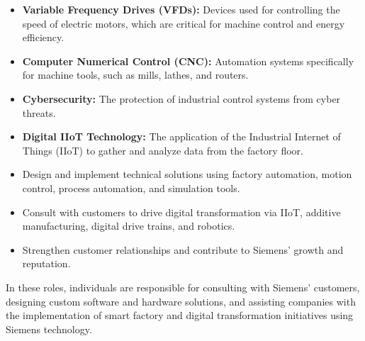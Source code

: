 \documentclass[11pt]{article}
\begin{document}
\begin{itemize}
  \item \textbf{Variable Frequency Drives (VFDs):} Devices used for controlling the speed of electric motors, which are critical for machine control and energy efficiency.
  \item \textbf{Computer Numerical Control (CNC):} Automation systems specifically for machine tools, such as mills, lathes, and routers.
  \item \textbf{Cybersecurity:} The protection of industrial control systems from cyber threats.
  \item \textbf{Digital IIoT Technology:} The application of the Industrial Internet of Things (IIoT) to gather and analyze data from the factory floor.
  \item Design and implement technical solutions using factory automation, motion control, process automation, and simulation tools.
  \item Consult with customers to drive digital transformation via IIoT, additive manufacturing, digital drive trains, and robotics.
  \item Strengthen customer relationships and contribute to Siemens' growth and reputation.
\end{itemize}

In these roles, individuals are responsible for consulting with Siemens' customers, designing custom software and hardware solutions, and assisting companies with the implementation of smart factory and digital transformation initiatives using Siemens technology.
\end{document}
